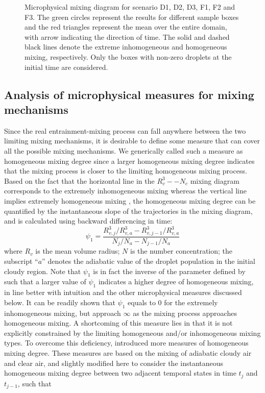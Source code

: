 \documentclass[draft,linenumbers]{AGUJournal}
\begin{document}
\begin{figure}[!htbp]
\caption{Microphysical mixing diagram for scenario D1, D2, D3, F1, F2 and F3. The green
circles represent the results for different sample boxes and the red triangles represent the mean over the entire domain, with arrow indicating the direction of time. The solid and dashed black lines denote the extreme inhomogeneous and homogeneous mixing, respectively. Only the boxes with non-zero droplets at the initial time are considered.}
\label{fig:mixing_diagram}
\end{figure}

\subsection{Analysis of microphysical measures for mixing mechanisms}
Since the real entrainment-mixing process can fall anywhere between the two limiting mixing mechanisms, it is desirable to define some measure that can cover all the possible mixing mechanisms. We generically called such a measure as homogeneous mixing degree since a larger homogeneous mixing degree indicates that the mixing process is closer to the limiting homogeneous mixing process. Based on the fact that the horizontal line in the $R_v^3−-N_c$ mixing diagram corresponds to the extremely inhomogeneous mixing whereas the vertical line implies extremely homogeneous mixing \citep{And09, Lu2013}, the homogeneous mixing degree can be quantified by the instantaneous slope of the trajectories in the mixing diagram, and is calculated using backward differencing in time: 
\begin{equation}
\psi_1 = \frac{R_{v,j}^3/R_{v,a}^3 - R_{v,j-1}^3/R_{v,a}^3}{N_{j}/N_a - N_{j-1}/N_a}
\label{phi1}
\end{equation}
where $R_v$ is the mean volume radius; $N$ is the number concentration; the subscript ``$a$'' denotes the adiabatic value of the droplet population in the initial cloudy region. Note that $\psi_1$ is in fact the inverse of the parameter defined by \citet{And09} such that a larger value of $\psi_1$ indicates a higher degree of homogeneous mixing, in line better with intuition and the other microphysical measures discussed below. It can be readily shown that $\psi_1$ equals to $0$ for the extremely inhomogeneous mixing, but approach $\infty$ as the mixing process approaches homogeneous mixing. A shortcoming of this measure lies in that it is not explicitly constrained by the limiting homogeneous and/or inhomogeneous mixing types. To overcome this deficiency, \citet{Lu2013, Lu2014} introduced more measures of homogeneous mixing degree. These measures are based on the mixing of adiabatic cloudy air and clear air, and slightly modified here to consider the instantaneous homogeneous mixing degree between two adjacent 
temporal states in time $t_j$ and $t_{j-1}$, such that
  
\end{document}
